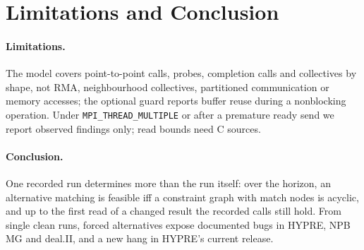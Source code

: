 \section{Limitations and Conclusion}
\label{sec:conclusion}

\paragraph{Limitations.} The model covers point-to-point calls, probes, completion calls and
collectives by shape, not RMA, neighbourhood collectives, partitioned communication or memory
accesses; the optional guard reports buffer reuse during a nonblocking operation. Under
\texttt{MPI\_THREAD\_MULTIPLE} or after a premature ready send we report observed findings only;
read bounds need C sources.

\paragraph{Conclusion.} One recorded run determines more than the run itself: over the
horizon, an alternative matching is feasible iff a constraint graph with match nodes is
acyclic, and up to the first read of a changed result the recorded calls still hold. From
single clean runs, forced alternatives expose documented bugs in HYPRE, NPB MG and deal.II,
and a new hang in HYPRE's current release.
